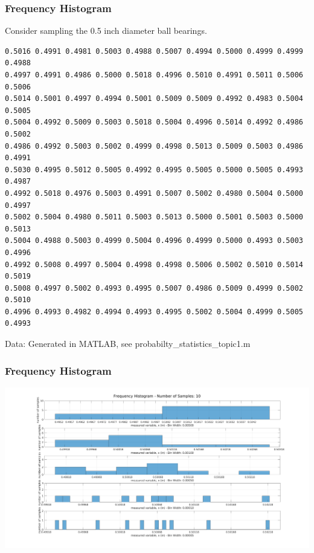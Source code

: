 \documentclass[fleqn]{beamer} %
\newcommand{\sectiontitleIII}{Frequency Histogram}
\begin{document}
	\begin{frame}[containsverbatim] \small
		\frametitle{\sectiontitleIII}    

Consider sampling the 0.5 inch diameter ball bearings.
\lstset{basicstyle=\scriptsize}


\begin{lstlisting}
0.5016 0.4991 0.4981 0.5003 0.4988 0.5007 0.4994 0.5000 0.4999 0.4999 0.4988  
0.4997 0.4991 0.4986 0.5000 0.5018 0.4996 0.5010 0.4991 0.5011 0.5006 0.5006  
0.5014 0.5001 0.4997 0.4994 0.5001 0.5009 0.5009 0.4992 0.4983 0.5004 0.5005 
0.5004 0.4992 0.5009 0.5003 0.5018 0.5004 0.4996 0.5014 0.4992 0.4986 0.5002 
0.4986 0.4992 0.5003 0.5002 0.4999 0.4998 0.5013 0.5009 0.5003 0.4986 0.4991
0.5030 0.4995 0.5012 0.5005 0.4992 0.4995 0.5005 0.5000 0.5005 0.4993 0.4987 
0.4992 0.5018 0.4976 0.5003 0.4991 0.5007 0.5002 0.4980 0.5004 0.5000 0.4997 
0.5002 0.5004 0.4980 0.5011 0.5003 0.5013 0.5000 0.5001 0.5003 0.5000 0.5013  
0.5004 0.4988 0.5003 0.4999 0.5004 0.4996 0.4999 0.5000 0.4993 0.5003 0.4996  
0.4992 0.5008 0.4997 0.5004 0.4998 0.4998 0.5006 0.5002 0.5010 0.5014 0.5019
0.5008 0.4997 0.5002 0.4993 0.4995 0.5007 0.4986 0.5009 0.4999 0.5002 0.5010  
0.4996 0.4993 0.4982 0.4994 0.4993 0.4995 0.5002 0.5004 0.4999 0.5005 0.4993 
\end{lstlisting}
		
		{\tiny Data: Generated in MATLAB, see probabilty\_statistics\_topic1.m }

	\end{frame}

	\begin{frame} \small
		\frametitle{\sectiontitleIII}    

	\includegraphics[scale=.25]{topic2_histogram_fig1}


	\end{frame}
	
\end{document}
